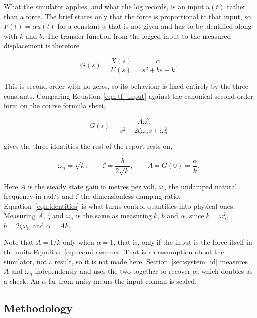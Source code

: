 What the simulator applies, and what the log records, is an input $u(t)$ rather than a force.
The brief states only that the force is proportional to that input, so $F(t) = \alpha u(t)$
for a constant $\alpha$ that is not given and has to be identified along with $k$ and $b$.
The transfer function from the logged input to the measured displacement is therefore

\begin{equation}\label{eqn:tf_input}
    G(s) = \frac{X(s)}{U(s)} = \frac{\alpha}{s^2 + bs + k}.
\end{equation}

This is second order with no zeros, so its behaviour is fixed entirely by the three
constants. Comparing Equation~\ref{eqn:tf_input} against the canonical second order form on
the course formula sheet,

\begin{equation}\label{eqn:canonical}
    G(s) = \frac{A\omega_n^2}{s^2 + 2\zeta\omega_n s + \omega_n^2}
\end{equation}

gives the three identities the rest of the report rests on,

\begin{equation}\label{eqn:identities}
    \omega_n = \sqrt{k}, \qquad
    \zeta = \frac{b}{2\sqrt{k}}, \qquad
    A = G(0) = \frac{\alpha}{k}.
\end{equation}

Here $A$ is the steady state gain in metres per volt, $\omega_n$ the undamped natural
frequency in rad/s and $\zeta$ the dimensionless damping ratio. Equation~\ref{eqn:identities}
is what turns control quantities into physical ones. Measuring $A$, $\zeta$ and $\omega_n$
is the same as measuring $k$, $b$ and $\alpha$, since $k = \omega_n^2$, $b = 2\zeta\omega_n$
and $\alpha = Ak$.

Note that $A = 1/k$ only when $\alpha = 1$, that is, only if the input is the force itself in
the units Equation~\ref{eqn:eom} assumes. That is an assumption about the simulator, not a
result, so it is not made here. Section~\ref{sec:system_id} measures $A$ and $\omega_n$
independently and uses the two together to recover $\alpha$, which doubles as a check. An
$\alpha$ far from unity means the input column is scaled.

\subsection{Methodology}

